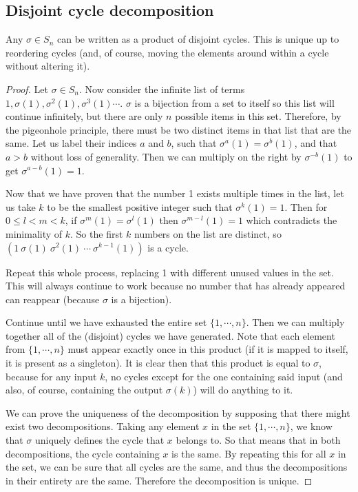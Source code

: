 \subsection{Disjoint cycle decomposition}
\begin{theorem}
	Any \(\sigma \in S_n\) can be written as a product of disjoint cycles.
	This is unique up to reordering cycles (and, of course, moving the elements around within a cycle without altering it).
\end{theorem}
\begin{proof}
	Let \(\sigma \in S_n\).
	Now consider the infinite list of terms \(1, \sigma(1), \sigma^2(1), \sigma^3(1) \cdots\).
	\(\sigma\) is a bijection from a set to itself so this list will continue infinitely, but there are only \(n\) possible items in this set.
	Therefore, by the pigeonhole principle, there must be two distinct items in that list that are the same.
	Let us label their indices \(a\) and \(b\), such that \(\sigma^a(1) = \sigma^b(1)\), and that \(a > b\) without loss of generality.
	Then we can multiply on the right by \(\sigma^{-b}(1)\) to get \(\sigma^{a-b}(1) = 1\).

	Now that we have proven that the number 1 exists multiple times in the list, let us take \(k\) to be the smallest positive integer such that \(\sigma^k(1) = 1\).
	Then for \(0 \leq l < m < k\), if \(\sigma^m(1) = \sigma^l(1)\) then \(\sigma^{m-l}(1) = 1\) which contradicts the minimality of \(k\).
	So the first \(k\) numbers on the list are distinct, so \((1\ \sigma(1)\ \sigma^2(1)\ \cdots\ \sigma^{k-1}(1))\) is a cycle.

	Repeat this whole process, replacing 1 with different unused values in the set.
	This will always continue to work because no number that has already appeared can reappear (because \(\sigma\) is a bijection).

	Continue until we have exhausted the entire set \(\{ 1, \cdots, n\}\).
	Then we can multiply together all of the (disjoint) cycles we have generated.
	Note that each element from \(\{ 1, \cdots, n\}\) must appear exactly once in this product (if it is mapped to itself, it is present as a singleton).
	It is clear then that this product is equal to \(\sigma\), because for any input \(k\), no cycles except for the one containing said input (and also, of course, containing the output \(\sigma(k)\)) will do anything to it.

	We can prove the uniqueness of the decomposition by supposing that there might exist two decompositions.
	Taking any element \(x\) in the set \(\{ 1, \cdots, n\}\), we know that \(\sigma\) uniquely defines the cycle that \(x\) belongs to.
	So that means that in both decompositions, the cycle containing \(x\) is the same.
	By repeating this for all \(x\) in the set, we can be sure that all cycles are the same, and thus the decompositions in their entirety are the same.
	Therefore the decomposition is unique.
\end{proof}

